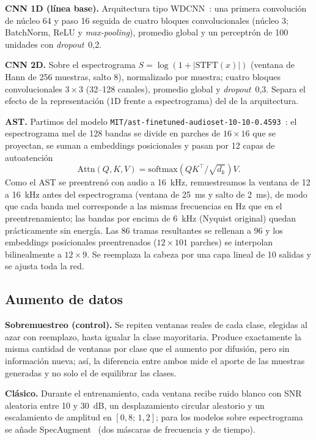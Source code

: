 \documentclass[conference]{IEEEtran}
\begin{document}
\textbf{CNN 1D (línea base).} Arquitectura tipo WDCNN~\cite{zhang2017wdcnn}: una primera convolución de núcleo 64 y paso 16 seguida de cuatro bloques convolucionales (núcleo 3; BatchNorm, ReLU y \emph{max-pooling}), promedio global y un perceptrón de 100 unidades con \emph{dropout}~0,2.

\textbf{CNN 2D.} Sobre el espectrograma $S=\log(1+|\mathrm{STFT}(x)|)$ (ventana de Hann de 256 muestras, salto 8), normalizado por muestra; cuatro bloques convolucionales $3\times3$ (32--128 canales), promedio global y \emph{dropout}~0,3. Separa el efecto de la representación (1D frente a espectrograma) del de la arquitectura.

\textbf{AST.} Partimos del modelo \nolinkurl{MIT/ast-finetuned-audioset-10-10-0.4593}~\cite{gong2021ast}: el espectrograma mel de 128 bandas se divide en parches de $16\times16$ que se proyectan, se suman a embeddings posicionales y pasan por 12 capas de autoatención
\begin{equation}
\mathrm{Attn}(Q,K,V)=\mathrm{softmax}\!\left(QK^\top/\sqrt{d_k}\right)V.
\end{equation}
Como el AST se preentrenó con audio a 16~kHz, remuestreamos la ventana de 12 a 16~kHz antes del espectrograma (ventana de 25~ms y salto de 2~ms), de modo que cada banda mel corresponde a las mismas frecuencias en Hz que en el preentrenamiento; las bandas por encima de 6~kHz (Nyquist original) quedan prácticamente sin energía. Las 86 tramas resultantes se rellenan a 96 y los embeddings posicionales preentrenados ($12\times101$ parches) se interpolan bilinealmente a $12\times9$. Se reemplaza la cabeza por una capa lineal de 10 salidas y se ajusta toda la red.

\subsection{Aumento de datos}
\textbf{Sobremuestreo (control).} Se repiten ventanas reales de cada clase, elegidas al azar con reemplazo, hasta igualar la clase mayoritaria. Produce exactamente la misma cantidad de ventanas por clase que el aumento por difusión, pero sin información nueva; así, la diferencia entre ambos mide el aporte de las muestras generadas y no solo el de equilibrar las clases.

\textbf{Clásico.} Durante el entrenamiento, cada ventana recibe ruido blanco con SNR aleatoria entre 10 y 30~dB, un desplazamiento circular aleatorio y un escalamiento de amplitud en $[0{,}8;\,1{,}2]$; para los modelos sobre espectrograma se añade SpecAugment~\cite{park2019specaugment} (dos máscaras de frecuencia y de tiempo).
\end{document}
